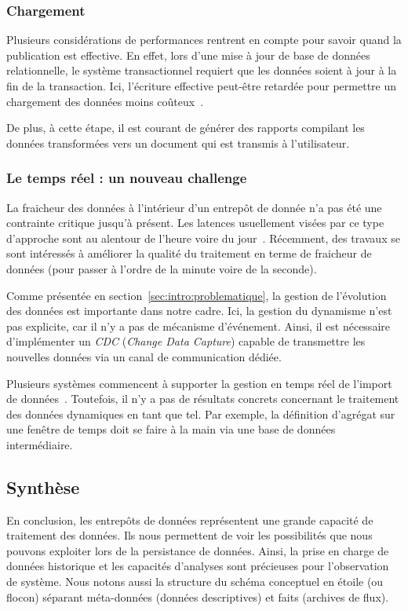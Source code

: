 \subsubsection{Chargement}
Plusieurs considérations de performances rentrent en compte pour savoir quand la publication est effective. En effet, lors d'une mise à jour de base de données relationnelle, le système transactionnel requiert que les données soient à jour à la fin de la transaction. Ici, l'écriture effective peut-être retardée pour permettre un chargement des données moins coûteux~\cite{Petit:historical}.

De plus, à cette étape, il est courant de générer des rapports compilant les données transformées vers un document qui est transmis à l'utilisateur.

\subsubsection{Le temps réel : un nouveau challenge}
La fraicheur des données à l'intérieur d'un entrepôt de donnée n'a pas été une contrainte critique jusqu'à présent. Les latences usuellement visées par ce type d'approche sont au alentour de l'heure voire du jour~\cite{Oracle:realtimedw}. Récemment, des travaux se sont intéressés à améliorer la qualité du traitement en terme de fraicheur de données (pour passer à l'ordre de la minute voire de la seconde).

Comme présentée en section~\ref{sec:intro:problematique}, la gestion de l'évolution des données est importante dans notre cadre. Ici, la gestion du dynamisme n'est pas explicite, car il n'y a pas de mécanisme d'événement. Ainsi, il est nécessaire d'implémenter un \textit{CDC} (\textit{Change Data Capture}) capable de transmettre les nouvelles données via un canal de communication dédiée.

Plusieurs systèmes commencent à supporter la gestion en temps réel de l'import de données~\cite{Thomsen:rite, Oracle:ODI}. Toutefois, il n'y a pas de résultats concrets concernant le traitement des données dynamiques en tant que tel. Par exemple, la définition d'agrégat sur une fenêtre de temps doit se faire à la main via une base de données intermédiaire.

\subsection{Synthèse}
En conclusion, les entrepôts de données représentent une grande capacité de traitement des données. Ils nous permettent de voir les possibilités que nous pouvons exploiter lors de la persistance de données. Ainsi, la prise en charge de données historique et les capacités d'analyses sont précieuses pour l'observation de système. Nous notons aussi la structure du schéma conceptuel en étoile (ou flocon) séparant méta-données (données descriptives) et faits (archives de flux).

